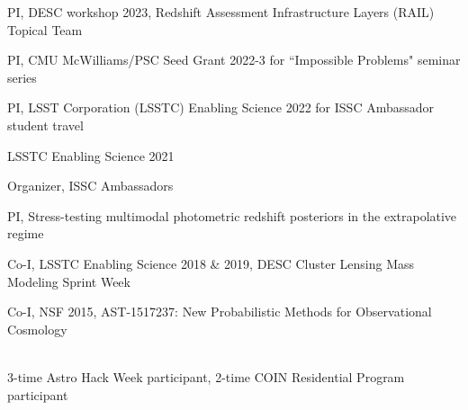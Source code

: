 \documentclass[11pt,letterpaper]{article}
\begin{document}
 \begin{list}{}{\malzlist}
 \item PI, DESC workshop 2023, Redshift Assessment Infrastructure Layers (RAIL) Topical Team
 \item PI, CMU McWilliams/PSC Seed Grant 2022-3 for ``Impossible Problems" seminar series
 \item PI, LSST Corporation (LSSTC) Enabling Science 2022 for ISSC Ambassador student travel
 \item LSSTC Enabling Science 2021
\begin{list}{}{\malzlist}
	\item Organizer, ISSC Ambassadors 
	\item PI, Stress-testing multimodal photometric redshift posteriors in the extrapolative regime
\end{list}
 \item Co-I, LSSTC Enabling Science 2018 \& 2019, DESC Cluster Lensing Mass Modeling Sprint Week%
\item Co-I, NSF 2015, AST-1517237: New Probabilistic Methods for Observational Cosmology
\end{list}

%
\clearpage

{\color{red} \fontsize{9pt}{5pt}\selectfont{X contributed presentations at Y conferences over Z years}}\\
3-time Astro Hack Week participant, 2-time COIN Residential Program participant
\end{document}
